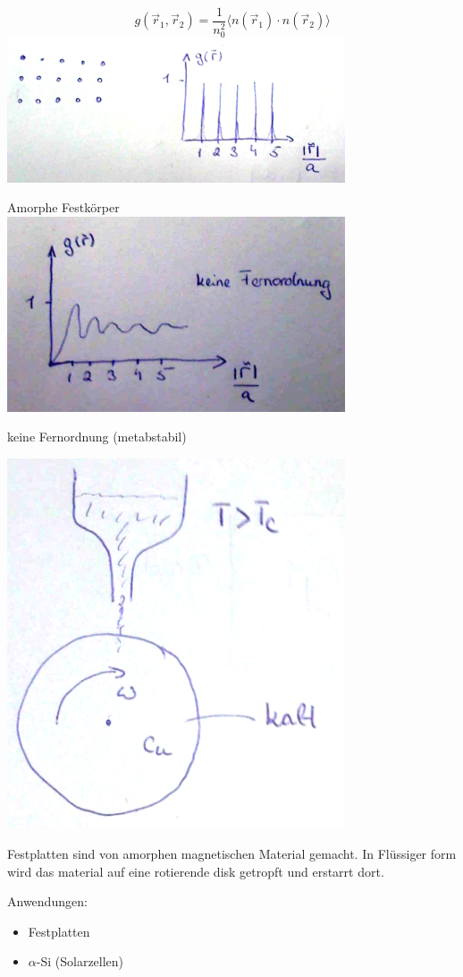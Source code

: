 \[ g(\vec r_1, \vec r_2) = \frac 1 {n^2_0} \langle n(\vec r_1)\cdot
n(\vec r_2) \rangle \]
\includegraphics[width=0.75\textwidth]{kap04_08.png}

Amorphe Festkörper
\includegraphics[width=0.75\textwidth]{kap04_09.png} 

keine Fernordnung (metabstabil)

\includegraphics[width=0.75\textwidth]{kap04_10.png}

Festplatten sind von amorphen magnetischen Material gemacht. In
Flüssiger form wird das material auf eine rotierende disk getropft und
erstarrt dort.

Anwendungen:
\begin{itemize}
\item Festplatten
\item \(\alpha\)-Si (Solarzellen)
\end{itemize}



